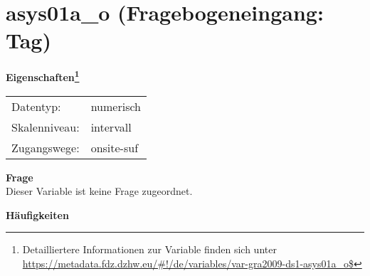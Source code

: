 
    \setcounter{footnote}{0}

    \vspace*{-1.8cm}
	\section{asys01a\_o (Fragebogeneingang: Tag)}
	\label{section:asys01a_o}



    \vspace*{0.5cm}
    \noindent\textbf{Eigenschaften\footnote{Detailliertere Informationen zur Variable finden sich unter
		\url{https://metadata.fdz.dzhw.eu/\#!/de/variables/var-gra2009-ds1-asys01a_o$}}}\\
	\begin{tabularx}{\hsize}{@{}lX}
	Datentyp: & numerisch \\
	Skalenniveau: & intervall \\
	Zugangswege: &
	  onsite-suf
 \\
    \end{tabularx}



		\vspace*{0.5cm}
		\noindent\textbf{Frage}\\
		Dieser Variable ist keine Frage zugeordnet.





        		\vspace*{0.5cm}
                \noindent\textbf{Häufigkeiten}

